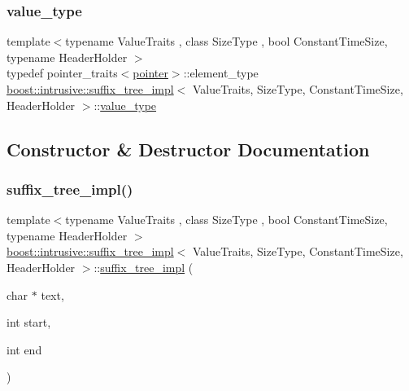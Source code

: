 \subsubsection{\texorpdfstring{value\+\_\+type}{value\_type}}
{\footnotesize\ttfamily template$<$typename Value\+Traits , class Size\+Type , bool Constant\+Time\+Size, typename Header\+Holder $>$ \\
typedef pointer\+\_\+traits$<$\hyperlink{classboost_1_1intrusive_1_1suffix__tree__impl_af8ad26e95f6cc7ba4a814d02eb8f4320}{pointer}$>$\+::element\+\_\+type \hyperlink{classboost_1_1intrusive_1_1suffix__tree__impl}{boost\+::intrusive\+::suffix\+\_\+tree\+\_\+impl}$<$ Value\+Traits, Size\+Type, Constant\+Time\+Size, Header\+Holder $>$\+::\hyperlink{classboost_1_1intrusive_1_1suffix__tree__impl_a592893260249dc653dfe9f36ea5d14b6}{value\+\_\+type}}



\subsection{Constructor \& Destructor Documentation}
\mbox{\label{classboost_1_1intrusive_1_1suffix__tree__impl_aa4b4ae2215af3b696dae241d1cbfe825}} 
\subsubsection{\texorpdfstring{suffix\+\_\+tree\+\_\+impl()}{suffix\_tree\_impl()}}
{\footnotesize\ttfamily template$<$typename Value\+Traits , class Size\+Type , bool Constant\+Time\+Size, typename Header\+Holder $>$ \\
\hyperlink{classboost_1_1intrusive_1_1suffix__tree__impl}{boost\+::intrusive\+::suffix\+\_\+tree\+\_\+impl}$<$ Value\+Traits, Size\+Type, Constant\+Time\+Size, Header\+Holder $>$\+::\hyperlink{classboost_1_1intrusive_1_1suffix__tree__impl}{suffix\+\_\+tree\+\_\+impl} (\begin{DoxyParamCaption}\item[{char $\ast$}]{text,  }\item[{int}]{start,  }\item[{int}]{end }\end{DoxyParamCaption})\hspace{0.3cm}{\ttfamily [inline]}}


